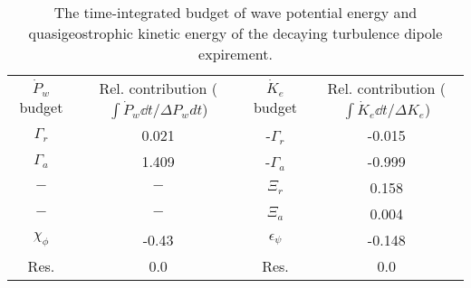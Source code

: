 \begin{table}
\begin{center}
\caption{The time-integrated budget of wave potential energy and quasigeostrophic                kinetic energy of the decaying turbulence dipole expirement. \label{table2}}
\begin{tabular}{cccc}
$\dot{P}_w$ budget & Rel. contribution ($\int\dot{P}_w \dd t/\Delta P_w dt$) & $\dot{K}_e$ budget & Rel. contribution ($\int\dot{K}_e \dd t/\Delta K_e$) \\
$\Gamma_r$ & 0.021 & -$\Gamma_r$ & -0.015 \\
$\Gamma_a$ & 1.409 & -$\Gamma_a$ & -0.999 \\
$-$ & $-$ & $\Xi_r$ & 0.158 \\
$-$ & $-$ & $\Xi_a$ & 0.004 \\
$\chi_\phi$ & -0.43 & $\epsilon_\psi$ & -0.148 \\
Res. & 0.0 & Res. & 0.0 \\
\end{tabular}
\end{center}
\end{table}
